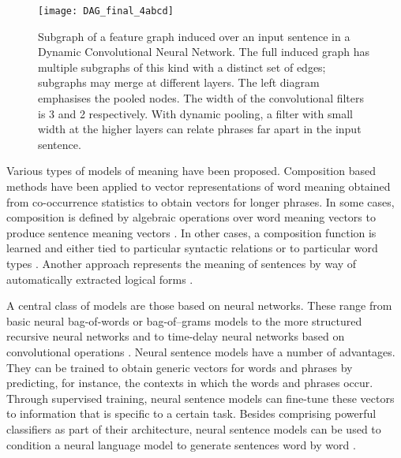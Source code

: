 \documentclass[11pt]{article}
\begin{document}
\begin{figure}
\centering
\label{DAGs}

{\texttt{[image: DAG\_final\_4abcd]}}
\vspace{-0.7cm}
\caption{Subgraph of a feature graph induced over an input sentence in a Dynamic Convolutional Neural Network. The full induced graph has multiple subgraphs of this kind with a distinct set of edges; subgraphs may merge at different layers. The left diagram emphasises the pooled nodes. The width of the convolutional filters is 3 and 2 respectively. With dynamic pooling, a filter with small width at the higher layers can relate phrases far apart in the input sentence.}
\vspace{-0.3cm}
\end{figure}



Various types of models of meaning have been proposed. Composition based methods have been applied to vector representations of word meaning obtained from co-occurrence statistics to obtain vectors for longer phrases. In some cases, composition is defined by algebraic operations over word meaning vectors to produce sentence meaning vectors \cite{Erk2008,mitchell2008vector,DBLP:journals/cogsci/MitchellL10,turney2012domain,erk2012vector,clarke2012context}. In other cases, a composition function is learned and either tied to particular syntactic relations \cite{Guevara2010,zanzotto2010estimating} or to particular word types \cite{DBLP:conf/emnlp/BaroniZ10,Coecke2010,grefenstette2011experimental,karts_sadr_emnlp,grefenstette2013category}. Another approach represents the meaning of sentences by way of automatically extracted logical forms \cite{DBLP:conf/uai/ZettlemoyerC05}. 

A central class of models are those based on neural networks. These range from basic neural bag-of-words or bag-of--grams models to the more structured recursive neural networks and to time-delay neural networks based on convolutional operations \cite{collobert:2008,SocherEtAl2011:RAE,KalchbrennerBlunsom2013:RCNN}. Neural sentence models have a number of advantages. They can be trained to obtain generic vectors for words and phrases by predicting, for instance, the contexts in which the words and phrases occur. Through supervised training, neural sentence models can fine-tune these vectors to information that is specific to a certain task. Besides comprising powerful classifiers as part of their architecture, neural sentence models can  be used to condition a neural language model to generate sentences word by word \cite{schwenk2012cstm,DBLP:conf/slt/MikolovZ12,kalchbrenner13emnlp}.
\end{document}
